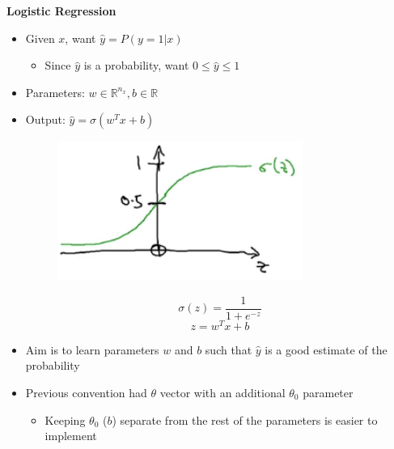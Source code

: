 \documentclass[12pt, letterpaper]{article}
\newcommand{\R}{\mathbb{R}}
\begin{document}
    \vspace{5mm}
    \textbf{Logistic Regression}
    \begin{itemize}
        \item Given $x$, want $\hat{y}=P(y=1|x)$
        \begin{itemize}
            \item Since $\hat{y}$ is a probability, want $0\leq\hat{y}\leq1$
        \end{itemize}
        \item Parameters: $w\in\R^{n_x}, b\in\R$
        \item Output: $\hat{y}=\sigma(w^Tx+b)$
        \begin{figure}[ht]
            \centering
            \includegraphics[width=8cm]{5.png}
        \end{figure}
        $$\sigma(z)=\frac{1}{1+e^{-z}}$$
        $$z=w^Tx+b$$
        \item Aim is to learn parameters $w$ and $b$ such that $\hat{y}$ is a good estimate of the probability
        \item Previous convention had $\theta$ vector with an additional $\theta_0$ parameter
        \begin{itemize}
            \item Keeping $\theta_0$ ($b$) separate from the rest of the parameters is easier to implement
        \end{itemize}
    \end{itemize}
\end{document}
